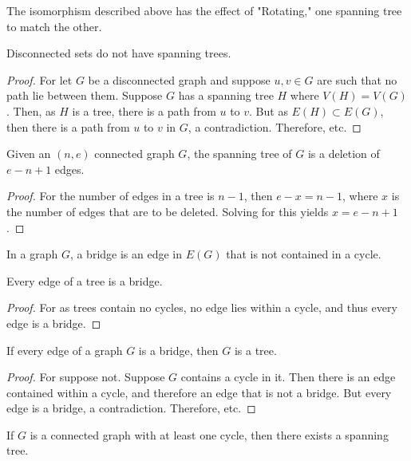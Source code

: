 \documentclass[crop=false,class=book,oneside]{standalone}
\begin{document}
        \begin{remark}
        The isomorphism described above has the effect of "Rotating," one spanning tree to match the other.
        \end{remark}
        \begin{theorem}
        Disconnected sets do not have spanning trees.
        \end{theorem}
        \begin{proof}
        For let $G$ be a disconnected graph and suppose $u,v\in G$ are such that no path lie between them. Suppose $G$ has a spanning tree $H$ where $V(H)=V(G)$. Then, as $H$ is a tree, there is a path from $u$ to $v$. But as $E(H)\subset E(G)$, then there is a path from $u$ to $v$ in $G$, a contradiction. Therefore, etc.
        \end{proof}
        \begin{theorem}
        Given an $(n,e)$ connected graph $G$, the spanning tree of $G$ is a deletion of $e-n+1$ edges.
        \end{theorem}
        \begin{proof}
        For the number of edges in a tree is $n-1$, then $e-x = n-1$, where $x$ is the number of edges that are to be deleted. Solving for this yields $x=e-n+1$.
        \end{proof}
        \begin{definition}
        In a graph $G$, a bridge is an edge in $E(G)$ that is not contained in a cycle.
        \end{definition}
        \begin{corollary}
        Every edge of a tree is a bridge.
        \end{corollary}
        \begin{proof}
        For as trees contain no cycles, no edge lies within a cycle, and thus every edge is a bridge.
        \end{proof}
        \begin{corollary}
        If every edge of a graph $G$ is a bridge, then $G$ is a tree.
        \end{corollary}
        \begin{proof}
        For suppose not. Suppose $G$ contains a cycle in it. Then there is an edge contained within a cycle, and therefore an edge that is not a bridge. But every edge is a bridge, a contradiction. Therefore, etc.
        \end{proof}
        \begin{theorem}
        If $G$ is a connected graph with at least one cycle, then there exists a spanning tree.
        \end{theorem}
\end{document}
